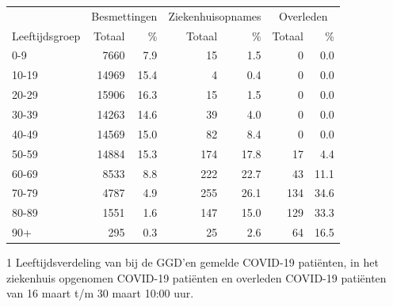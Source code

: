 \documentclass[
  english,
  man,floatsintext]{apa6}
\begin{document}
\begin{table}
\centering\begingroup\fontsize{11}{13}\selectfont

\begin{threeparttable}
\begin{tabular}{lrrrrrr}
\toprule
\multicolumn{1}{c}{ } & \multicolumn{2}{c}{Besmettingen} & \multicolumn{2}{c}{Ziekenhuisopnames} & \multicolumn{2}{c}{Overleden} \\
\cmidrule(l{3pt}r{3pt}){2-3} \cmidrule(l{3pt}r{3pt}){4-5} \cmidrule(l{3pt}r{3pt}){6-7}
Leeftijdsgroep & Totaal & \% & Totaal & \% & Totaal & \%\\
\midrule
0-9 & 7660 & 7.9 & 15 & 1.5 & 0 & 0.0\\
10-19 & 14969 & 15.4 & 4 & 0.4 & 0 & 0.0\\
20-29 & 15906 & 16.3 & 15 & 1.5 & 0 & 0.0\\
30-39 & 14263 & 14.6 & 39 & 4.0 & 0 & 0.0\\
40-49 & 14569 & 15.0 & 82 & 8.4 & 0 & 0.0\\
50-59 & 14884 & 15.3 & 174 & 17.8 & 17 & 4.4\\
60-69 & 8533 & 8.8 & 222 & 22.7 & 43 & 11.1\\
70-79 & 4787 & 4.9 & 255 & 26.1 & 134 & 34.6\\
80-89 & 1551 & 1.6 & 147 & 15.0 & 129 & 33.3\\
90+ & 295 & 0.3 & 25 & 2.6 & 64 & 16.5\\
\bottomrule
\end{tabular}
\begin{tablenotes}
\item[1] Leeftijdsverdeling van bij de GGD’en gemelde COVID-19 patiënten, in het ziekenhuis opgenomen COVID-19 patiënten en overleden COVID-19 patiënten van 16 maart t/m 30 maart 10:00 uur.
\end{tablenotes}
\end{threeparttable}
\endgroup{}
\end{table}

\newpage
\end{document}
